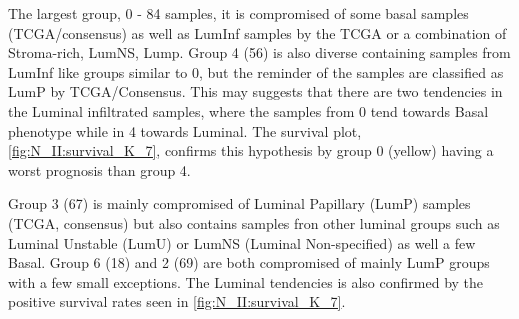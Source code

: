 The largest group, 0 - 84 samples, it is compromised of some basal samples (TCGA/consensus) as well as LumInf samples by the TCGA or a combination of Stroma-rich, LumNS, Lump. Group 4 (56) is also diverse containing samples from LumInf like groups similar to 0, but the reminder of the samples are classified as LumP by TCGA/Consensus. This may suggests that there are two tendencies in the Luminal infiltrated samples, where the samples from 0 tend towards Basal phenotype while in 4 towards Luminal. The survival plot, \cref{fig:N_II:survival_K_7}, confirms this hypothesis by group 0 (yellow) having a worst prognosis than group 4.

Group 3 (67) is mainly compromised of Luminal Papillary (LumP) samples (TCGA, consensus) but also contains samples fron other luminal groups such as Luminal Unstable (LumU) or LumNS (Luminal Non-specified) as well a few Basal. Group 6 (18) and 2 (69) are both compromised of mainly LumP groups with a few small exceptions. The Luminal tendencies is also confirmed by the positive survival rates seen in \cref{fig:N_II:survival_K_7}.

